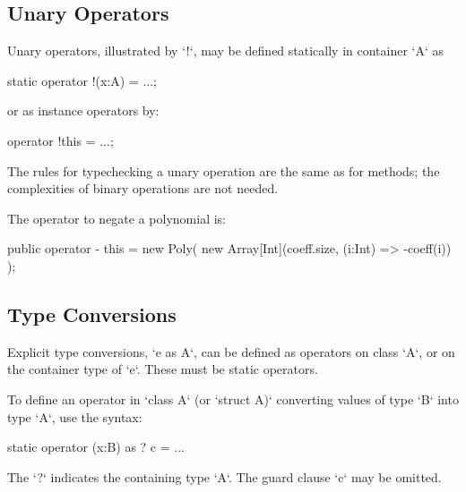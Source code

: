 \subsection{Unary Operators}

Unary operators,  illustrated by \xcd`!`, may be defined statically in
container 
\xcd`A` as 
\begin{xten}
static operator !(x:A) = ...;
\end{xten}
or as instance operators by: 
\begin{xten}
operator !this = ...;
\end{xten}


The rules for typechecking a unary operation are the same as for methods; the
complexities of binary operations are not needed.

\begin{ex}
The operator to negate a polynomial is: 

\begin{xten}
  public operator - this = new Poly(
    new Array[Int](coeff.size, (i:Int) => -coeff(i))
    );
\end{xten}



\end{ex}


\subsection{Type Conversions}
\label{sect:type-conv}


Explicit type conversions, \xcd`e as A`, can be defined as operators on
class \xcd`A`, or on the container type of \xcd`e`.  These must be static
operators.  

To define an operator in \xcd`class A` (or \xcd`struct A)` converting values
of type \xcd`B` into type \xcd`A`, use the syntax: 
\begin{xten}
static operator (x:B) as ? {c} = ... 
\end{xten}
The \xcd`?` indicates the containing type \xcd`A`.  
The guard clause \xcd`{c}` may be omitted.



